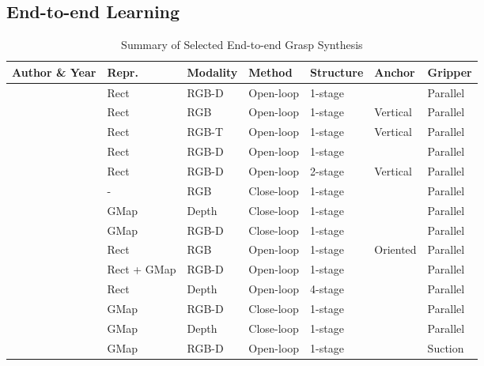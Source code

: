 \documentclass[letterpaper,10pt]{article}
\newcommand{\xmark}{\ding{55}}%
\begin{document}
\subsection{End-to-end Learning}
\label{sec:e2e-grasp}


\begin{table}[t]
\caption{Summary of Selected End-to-end Grasp Synthesis}
\label{table:e2e-grasp}
\begin{center}
\begin{tabularx}{1\columnwidth}{m{3.6cm}m{2cm}<{\centering}m{1.8cm}<{\centering}m{1.6cm}<{\centering}m{1.6cm}<{\centering}m{1.2cm}<{\centering}m{1.2cm}<{\centering}}
\toprule
 \bf Author \& \bf Year & \bf Repr. & \bf Modality & \bf Method  &\bf Structure & \bf Anchor &\bf Gripper \\
\midrule
\cite{redmon2015real} & Rect & RGB-D & Open-loop & 1-stage & \xmark & Parallel \\
\cite{guo2016deep} & Rect & RGB & Open-loop & 1-stage & Vertical & Parallel \\
\cite{guo2017hybrid} & Rect & RGB-T & Open-loop & 1-stage & Vertical & Parallel \\
\cite{kumra2017robotic} & Rect & RGB-D & Open-loop & 1-stage & \xmark & Parallel \\
\cite{chu2018real} & Rect & RGB-D & Open-loop & 2-stage & Vertical & Parallel\\
\cite{levine2018learning} & - & RGB & Close-loop & 1-stage & \xmark & Parallel \\
\cite{morrison2018closing} & GMap & Depth & Close-loop & 1-stage & \xmark & Parallel \\
\cite{zeng2018learning} & GMap & RGB-D & Close-loop & 1-stage & \xmark & Parallel \\
\cite{zhou2018fully} & Rect & RGB & Open-loop & 1-stage & Oriented & Parallel \\
\cite{asif2019densely} & Rect + GMap & RGB-D & Open-loop & 1-stage & \xmark & Parallel \\
\cite{gariepy2019gq} & Rect & Depth & Open-loop & 4-stage & \xmark & Parallel \\
\cite{liu2019active} & GMap & RGB-D & Close-loop & 1-stage & \xmark & Parallel \\
\cite{morrison2019multi} & GMap & Depth & Close-loop & 1-stage & \xmark & Parallel\\
\cite{shao2019combining} & GMap & RGB-D & Open-loop & 1-stage & \xmark & Suction \\

\end{tabularx}
\end{center}
\end{table}
\end{document}
